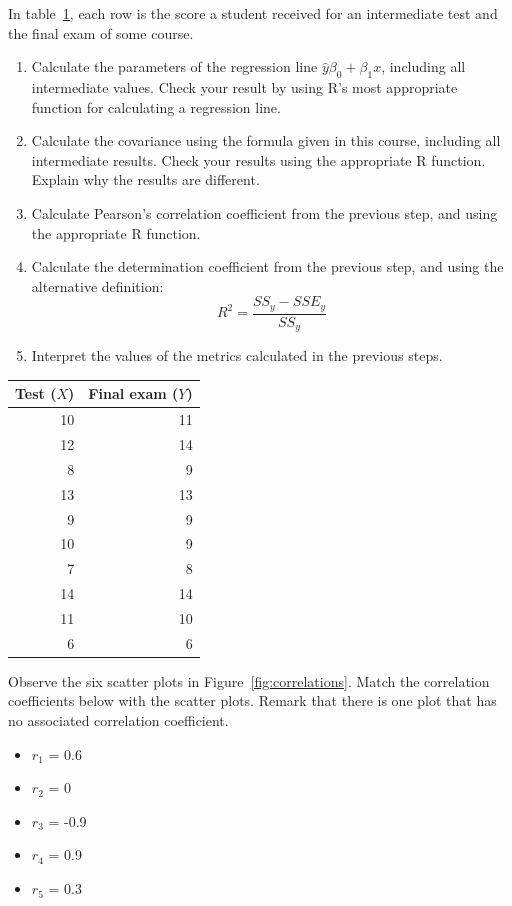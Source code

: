 \begin{exercise}
  \label{ex:regression-manual}
  
  In table~\ref{tab:test-exam}, each row is the score a student received for an intermediate test and the final exam of some course.
  \begin{enumerate}
    \item Calculate the parameters of the regression line $\hat{y}\beta_{0} + \beta_{1} x$, including all intermediate values. Check your result by using R's most appropriate function for calculating a regression line.
    \item Calculate the covariance using the formula given in this course, including all intermediate results. Check your results using the appropriate R function. Explain why the results are different.
    \item Calculate Pearson's correlation coefficient from the previous step, and using the appropriate R function.
    \item Calculate the determination coefficient from the previous step, and using the alternative definition:
    \[R^2 = \frac{SS_y - SSE_y}{SS_y}\]
    \item Interpret the values of the metrics calculated in the previous steps.
  \end{enumerate}
\end{exercise}

\begin{table}
  \centering
  \begin{tabular}{@{}rr@{}} \toprule
    Test ($X$) & Final exam ($Y$) \\
    \midrule
    10 & 11 \\
    12 & 14 \\
    8 & 9 \\
    13 & 13 \\
    9 & 9 \\
    10 &  9 \\
    7 & 8 \\
    14 & 14 \\
    11 & 10 \\
    6 & 6  \\
    \bottomrule
  \end{tabular}
  \label{tab:test-exam}
\end{table}

\begin{exercise}
  Observe the six scatter plots in Figure~\ref{fig:correlations}. Match the correlation coefficients below with the scatter plots. Remark that there is one plot that has no associated correlation coefficient.
  
  \begin{itemize}
    \item $r_{1}$ = 0.6
    \item $r_{2}$ = 0
    \item $r_{3}$ = -0.9
    \item $r_{4}$ = 0.9
    \item $r_{5}$ = 0.3
  \end{itemize}
\end{exercise}

